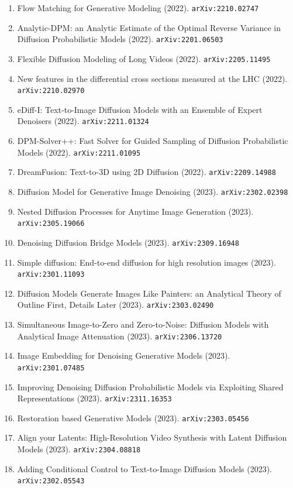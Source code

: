 \documentclass[11pt]{article}
\begin{document}
\begin{enumerate}
  \item Flow Matching for Generative Modeling (2022). \texttt{arXiv:2210.02747}
  \item Analytic-DPM: an Analytic Estimate of the Optimal Reverse Variance in
  Diffusion Probabilistic Models (2022). \texttt{arXiv:2201.06503}
  \item Flexible Diffusion Modeling of Long Videos (2022). \texttt{arXiv:2205.11495}
  \item New features in the differential cross sections measured at the LHC (2022). \texttt{arXiv:2210.02970}
  \item eDiff-I: Text-to-Image Diffusion Models with an Ensemble of Expert
  Denoisers (2022). \texttt{arXiv:2211.01324}
  \item DPM-Solver++: Fast Solver for Guided Sampling of Diffusion Probabilistic Models (2022). \texttt{arXiv:2211.01095}
  \item DreamFusion: Text-to-3D using 2D Diffusion (2022). \texttt{arXiv:2209.14988}
  \item Diffusion Model for Generative Image Denoising (2023). \texttt{arXiv:2302.02398}
  \item Nested Diffusion Processes for Anytime Image Generation (2023). \texttt{arXiv:2305.19066}
  \item Denoising Diffusion Bridge Models (2023). \texttt{arXiv:2309.16948}
  \item Simple diffusion: End-to-end diffusion for high resolution images (2023). \texttt{arXiv:2301.11093}
  \item Diffusion Models Generate Images Like Painters: an Analytical Theory of
  Outline First, Details Later (2023). \texttt{arXiv:2303.02490}
  \item Simultaneous Image-to-Zero and Zero-to-Noise: Diffusion Models with
  Analytical Image Attenuation (2023). \texttt{arXiv:2306.13720}
  \item Image Embedding for Denoising Generative Models (2023). \texttt{arXiv:2301.07485}
  \item Improving Denoising Diffusion Probabilistic Models via Exploiting Shared
  Representations (2023). \texttt{arXiv:2311.16353}
  \item Restoration based Generative Models (2023). \texttt{arXiv:2303.05456}
  \item Align your Latents: High-Resolution Video Synthesis with Latent
  Diffusion Models (2023). \texttt{arXiv:2304.08818}
  \item Adding Conditional Control to Text-to-Image Diffusion Models (2023). \texttt{arXiv:2302.05543}

\end{enumerate}
\end{document}
